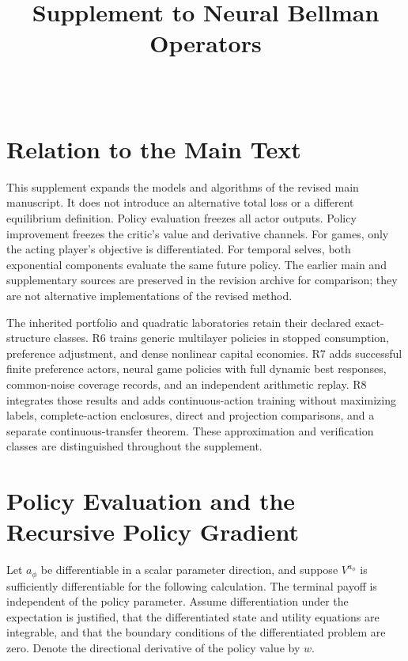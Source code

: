 \documentclass[ecta,draft]{econsocart}
\begin{document}
\begin{frontmatter}
\title{Supplement to Neural Bellman Operators}
\begin{aug}
\author[id=au1,addressref={add1}]{~}
\address[id=add1]{Peking University}
\end{aug}
\end{frontmatter}

\section{Relation to the Main Text}
This supplement expands the models and algorithms of the revised main manuscript. It does not introduce an alternative total loss or a different equilibrium definition. Policy evaluation freezes all actor outputs. Policy improvement freezes the critic's value and derivative channels. For games, only the acting player's objective is differentiated. For temporal selves, both exponential components evaluate the same future policy. The earlier main and supplementary sources are preserved in the revision archive for comparison; they are not alternative implementations of the revised method.

The inherited portfolio and quadratic laboratories retain their declared exact-structure classes. R6 trains generic multilayer policies in stopped consumption, preference adjustment, and dense nonlinear capital economies. R7 adds successful finite preference actors, neural game policies with full dynamic best responses, common-noise coverage records, and an independent arithmetic replay. R8 integrates those results and adds continuous-action training without maximizing labels, complete-action enclosures, direct and projection comparisons, and a separate continuous-transfer theorem. These approximation and verification classes are distinguished throughout the supplement.

\section{Policy Evaluation and the Recursive Policy Gradient}
Let $a_\phi$ be differentiable in a scalar parameter direction, and suppose $V^{a_\phi}$ is sufficiently differentiable for the following calculation. The terminal payoff is independent of the policy parameter. Assume differentiation under the expectation is justified, that the differentiated state and utility equations are integrable, and that the boundary conditions of the differentiated problem are zero. Denote the directional derivative of the policy value by $w$.
\end{document}
